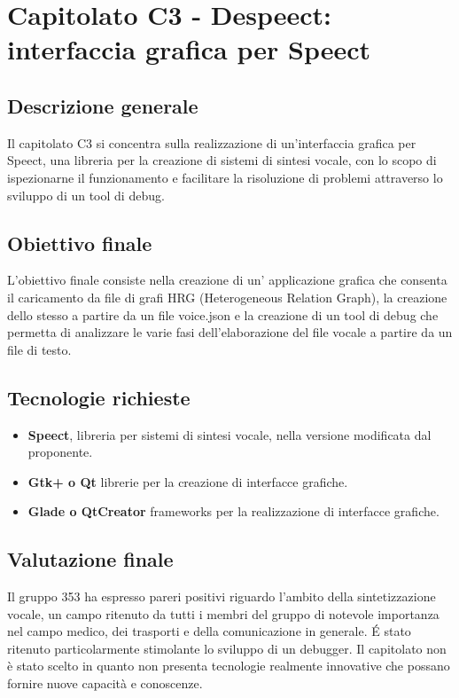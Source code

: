 \documentclass[main.tex]{subfiles}
\begin{document}
\chapter{Capitolato C3 - Despeect: \\interfaccia grafica per Speect}
\section{Descrizione generale}
Il capitolato C3 si concentra sulla realizzazione di un'interfaccia grafica per Speect, una libreria per la creazione di sistemi di sintesi vocale, con lo scopo di ispezionarne il funzionamento e facilitare la risoluzione di problemi attraverso lo sviluppo di un tool di debug. 
\section{Obiettivo finale}
L'obiettivo finale consiste nella creazione di un’ applicazione grafica che consenta il caricamento da file di grafi HRG (Heterogeneous Relation Graph), la creazione dello stesso a partire da un file voice.json e la creazione di un tool di debug che permetta di analizzare le varie fasi dell'elaborazione del file vocale a partire da un file di testo.
\section{Tecnologie richieste}
\begin{itemize}
	\item \textbf{Speect}, libreria per sistemi di sintesi vocale, nella versione modificata dal proponente.
	\item \textbf{Gtk+ o Qt} librerie per la creazione di interfacce grafiche.
	\item \textbf{Glade o QtCreator} frameworks per la realizzazione di interfacce grafiche.
\end{itemize}
\section{Valutazione finale}
Il gruppo 353 ha espresso pareri positivi riguardo l'ambito della sintetizzazione vocale, un campo ritenuto da tutti i membri del gruppo di notevole importanza nel campo medico, dei trasporti e della comunicazione in generale.
\'{E} stato ritenuto particolarmente stimolante lo sviluppo di un debugger.
Il capitolato non è stato scelto in quanto non presenta tecnologie realmente innovative che possano fornire nuove capacità e conoscenze.
\end{document}
